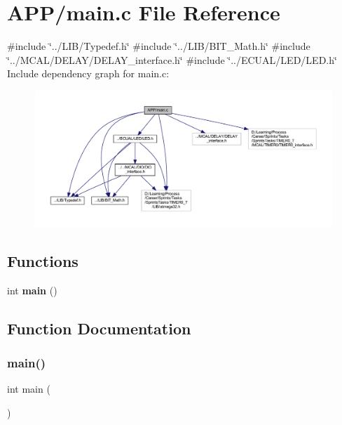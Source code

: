 \section{A\+P\+P/main.c File Reference}
\label{main_8c}
{\ttfamily \#include \char`\"{}../\+L\+I\+B/\+Typedef.\+h\char`\"{}}\newline
{\ttfamily \#include \char`\"{}../\+L\+I\+B/\+B\+I\+T\+\_\+\+Math.\+h\char`\"{}}\newline
{\ttfamily \#include \char`\"{}../\+M\+C\+A\+L/\+D\+E\+L\+A\+Y/\+D\+E\+L\+A\+Y\+\_\+interface.\+h\char`\"{}}\newline
{\ttfamily \#include \char`\"{}../\+E\+C\+U\+A\+L/\+L\+E\+D/\+L\+E\+D.\+h\char`\"{}}\newline
Include dependency graph for main.\+c\+:
\nopagebreak
\begin{figure}[H]
\begin{center}
\leavevmode
\includegraphics[width=350pt]{main_8c__incl}
\end{center}
\end{figure}
\subsection*{Functions}
\begin{DoxyCompactItemize}
\item 
int \textbf{ main} ()
\end{DoxyCompactItemize}


\subsection{Function Documentation}
\mbox{\label{main_8c_ae66f6b31b5ad750f1fe042a706a4e3d4}} 
\subsubsection{main()}
{\footnotesize\ttfamily int main (\begin{DoxyParamCaption}{ }\end{DoxyParamCaption})}

